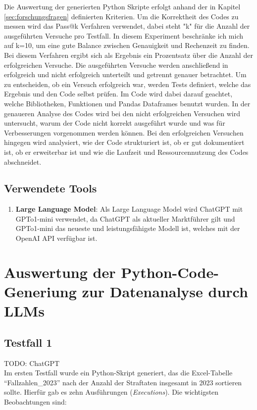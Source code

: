 \documentclass[11pt,a4paper]{article}
\begin{document}
    Die Auswertung der generierten Python Skripte erfolgt anhand der in Kapitel \ref{sec:forschungsfragen} definierten Kriterien. Um die Korrektheit des Codes zu messen wird das Pass@k Verfahren verwendet, dabei steht "k" für die Anzahl der ausgeführten Versuche pro Testfall. In diesem Experiment beschränke ich mich auf k=10, um eine gute Balance zwischen Genauigkeit und Rechenzeit zu finden. Bei diesem Verfahren ergibt sich als Ergebnis ein Prozentsatz über die Anzahl der erfolgreichen Versuche. Die ausgeführten Versuche werden anschließend in erfolgreich und nicht erfolgreich unterteilt und getrennt genauer betrachtet. Um zu entscheiden, ob ein Versuch erfolgreich war, werden Tests definiert, welche das Ergebnis und den Code selbst prüfen. Im Code wird dabei darauf geachtet, welche Bibliotheken, Funktionen und Pandas Dataframes benutzt wurden.
    In der genaueren Analyse des Codes wird bei den nicht erfolgreichen Versuchen wird untersucht, warum der Code nicht korrekt ausgeführt wurde und was für Verbesserungen vorgenommen werden können. Bei den erfolgreichen Versuchen hingegen wird analysiert, wie der Code strukturiert ist, ob er gut dokumentiert ist, ob er erweiterbar ist und wie die Laufzeit und Ressourcennutzung des Codes abschneidet.

\subsection{Verwendete Tools}
    \begin{enumerate}
        \item \textbf{Large Language Model}: Als Large Language Model wird ChatGPT mit GPTo1-mini verwendet, da ChatGPT als aktueller Marktführer gilt und GPTo1-mini das neueste und leistungsfähigste Modell ist, welches mit der OpenAI API verfügbar ist.
        
    \end{enumerate}

\section{Auswertung der Python-Code-Generiung zur Datenanalyse durch LLMs}
\label{sec:auswertung}
\subsection{Testfall 1}
\label{subsec:auswertung_testfall1}
TODO: ChatGPT\\
Im ersten Testfall wurde ein Python-Skript generiert, das die Excel-Tabelle \enquote{Fallzahlen\_2023} nach der Anzahl der Straftaten insgesamt in 2023 sortieren sollte. Hierfür gab es zehn Ausführungen (\emph{Executions}). Die wichtigsten Beobachtungen sind:
\end{document}
